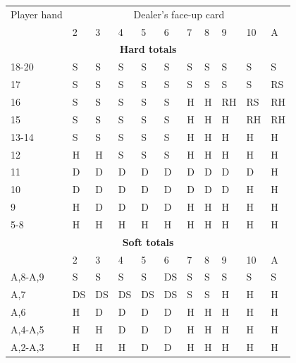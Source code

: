 \documentclass[conference]{IEEEtran}
\begin{document}
\begin{table}[ht]
\tiny
\centering
\begin{tabular}{|l|l|l|l|l|l|l|l|l|l|l|}
\hline

{Player hand} & \multicolumn{10}{c|}{Dealer's face-up card}     \\ \cline{2-11} 
                             & 2 & 3 & 4 & 5 & 6 & 7 & 8 & 9 & 10 & A \\ \hline
\multicolumn{11}{|c|}{\textbf{Hard totals}}                           \\ \hline
18-20       								 & S & S & S & S & S & S & S & S & S & S  \\ \hline
17                           & S & S & S & S & S & S & S & S & S & RS  \\ \hline
16                           & S & S & S & S & S & H & H & RH & RS & RH  \\ \hline
15                           & S & S & S & S & S & H & H & H & RH & RH  \\ \hline
13-14                        & S & S & S & S & S & H & H & H & H & H  \\ \hline
12                           & H & H & S & S & S & H & H & H & H & H  \\ \hline
11                           & D & D & D & D & D & D & D & D & D & H  \\ \hline
10                           & D & D & D & D & D & D & D & D & H & H  \\ \hline
9                            & H & D & D & D & D & H & H & H & H & H  \\ \hline
5-8                          & H & H & H & H & H & H & H & H & H & H  \\ \hline

\multicolumn{11}{|c|}{\textbf{Soft totals}}                           \\ \hline
                             & 2 & 3 & 4 & 5 & 6 & 7 & 8 & 9 & 10 & A \\ \hline
A,8-A,9                      & S & S & S & S & DS & S & S & S & S & S  \\ \hline
A,7                          & DS & DS & DS & DS & DS & S & S & H & H & H  \\ \hline
A,6                          & H & D & D & D & D & H & H & H & H & H  \\ \hline
A,4-A,5                      & H & H & D & D & D & H & H & H & H & H  \\ \hline
A,2-A,3                      & H & H & H & D & D & H & H & H & H & H  \\ \hline


\end{tabular}
\end{table}
\end{document}
